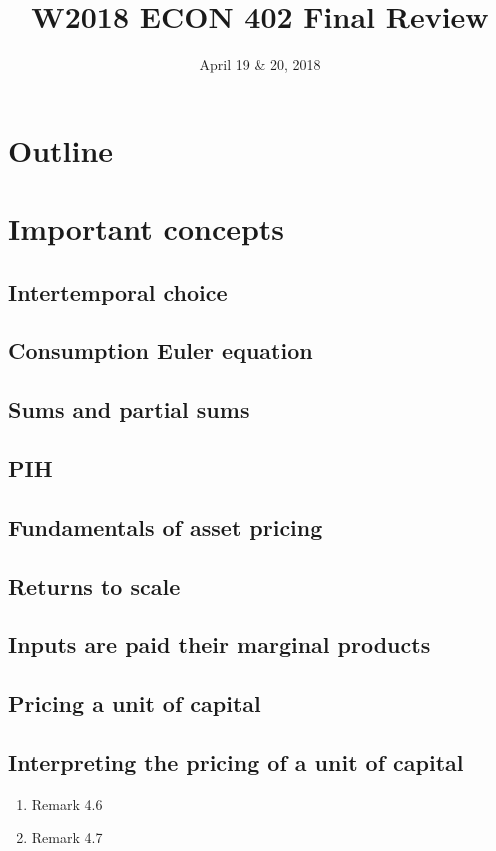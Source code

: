 \documentclass[11pt]{article}
\date{April 19 \& 20, 2018}
\title{W2018 ECON 402 Final Review}
\begin{document}
\maketitle
\setcounter{tocdepth}{1}
\tableofcontents

\section{Outline}
\label{sec-1}
\section{Important concepts}
\label{sec-2}
\subsection{Intertemporal choice}
\label{sec-2-1}
\subsection{Consumption Euler equation}
\label{sec-2-2}
\subsection{Sums and partial sums}
\label{sec-2-3}
\subsection{PIH}
\label{sec-2-4}
\subsection{Fundamentals of asset pricing}
\label{sec-2-5}
\subsection{Returns to scale}
\label{sec-2-6}
\subsection{Inputs are paid their marginal products}
\label{sec-2-7}
\subsection{Pricing a unit of capital}
\label{sec-2-8}
\subsection{Interpreting the pricing of a unit of capital}
\label{sec-2-9}
\begin{enumerate}
\item Remark 4.6
\label{sec-2-9-1}
\item Remark 4.7
\label{sec-2-9-2}
\end{enumerate}
\end{document}
